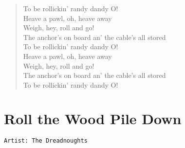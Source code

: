 \documentclass[11pt]{article}
\begin{document}
\begin{verse}
To be rollickin' randy dandy O!\\
\vspace*{1em}
Heave a pawl, oh, heave away\\
Weigh, hey, roll and go!\\
The anchor's on board an' the cable's all stored\\
To be rollickin' randy dandy O!\\
\vspace*{1em}
Heave a pawl, oh, heave away\\
Weigh, hey, roll and go!\\
The anchor's on board an' the cable's all stored\\
To be rollickin' randy dandy O!\\
\end{verse}
\clearpage
\section{Roll the Wood Pile Down}
\label{sec:orgff3ce06}
\begin{verbatim}
Artist: The Dreadnoughts
\end{verbatim}
\end{document}

